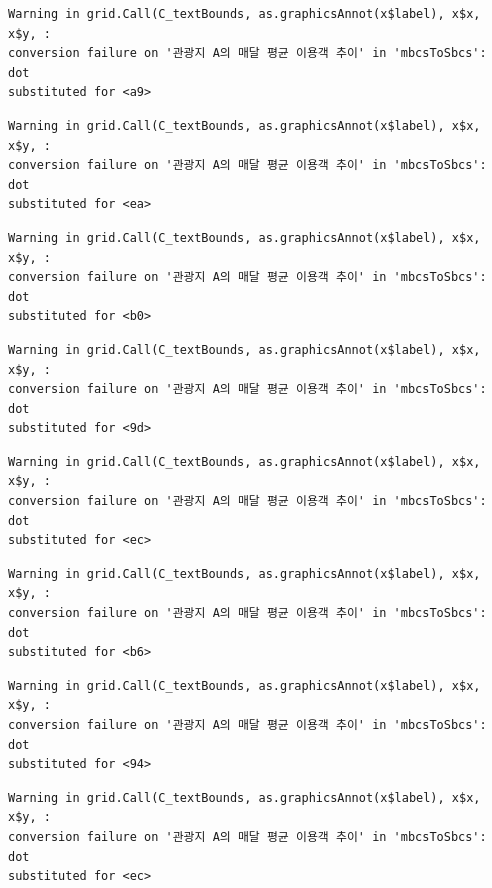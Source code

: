 \documentclass[
  letterpaper,
  DIV=11,
  numbers=noendperiod]{scrreprt}
\begin{document}
\begin{verbatim}
Warning in grid.Call(C_textBounds, as.graphicsAnnot(x$label), x$x, x$y, :
conversion failure on '관광지 A의 매달 평균 이용객 추이' in 'mbcsToSbcs': dot
substituted for <a9>
\end{verbatim}

\begin{verbatim}
Warning in grid.Call(C_textBounds, as.graphicsAnnot(x$label), x$x, x$y, :
conversion failure on '관광지 A의 매달 평균 이용객 추이' in 'mbcsToSbcs': dot
substituted for <ea>
\end{verbatim}

\begin{verbatim}
Warning in grid.Call(C_textBounds, as.graphicsAnnot(x$label), x$x, x$y, :
conversion failure on '관광지 A의 매달 평균 이용객 추이' in 'mbcsToSbcs': dot
substituted for <b0>
\end{verbatim}

\begin{verbatim}
Warning in grid.Call(C_textBounds, as.graphicsAnnot(x$label), x$x, x$y, :
conversion failure on '관광지 A의 매달 평균 이용객 추이' in 'mbcsToSbcs': dot
substituted for <9d>
\end{verbatim}

\begin{verbatim}
Warning in grid.Call(C_textBounds, as.graphicsAnnot(x$label), x$x, x$y, :
conversion failure on '관광지 A의 매달 평균 이용객 추이' in 'mbcsToSbcs': dot
substituted for <ec>
\end{verbatim}

\begin{verbatim}
Warning in grid.Call(C_textBounds, as.graphicsAnnot(x$label), x$x, x$y, :
conversion failure on '관광지 A의 매달 평균 이용객 추이' in 'mbcsToSbcs': dot
substituted for <b6>
\end{verbatim}

\begin{verbatim}
Warning in grid.Call(C_textBounds, as.graphicsAnnot(x$label), x$x, x$y, :
conversion failure on '관광지 A의 매달 평균 이용객 추이' in 'mbcsToSbcs': dot
substituted for <94>
\end{verbatim}

\begin{verbatim}
Warning in grid.Call(C_textBounds, as.graphicsAnnot(x$label), x$x, x$y, :
conversion failure on '관광지 A의 매달 평균 이용객 추이' in 'mbcsToSbcs': dot
substituted for <ec>
\end{verbatim}
\end{document}
